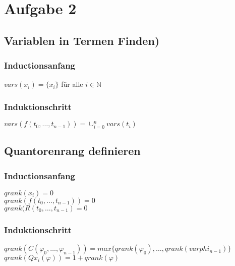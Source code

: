 \section*{Aufgabe 2}

\subsection*{Variablen in Termen Finden)}

\subsubsection*{Inductionsanfang}
$vars(x_i)=\{ x_i\} $ für alle $i \in \mathbb{N}$


\subsubsection*{Induktionschritt}
$vars(f(t_0, \ldots , t_{n-1}))= \cup_{i=0}^{n} vars(t_i)$

\subsection*{Quantorenrang definieren}
\subsubsection*{Inductionsanfang}
$qrank(x_i)=0$\\
$qrank(f(t_0, \ldots ,t_{n-1} ))=0$\\
$qrank(R(t_0, \ldots , t_{n-1})=0$\\
\subsubsection*{Induktionschritt}
$qrank(C(\varphi_{0}, \ldots , \varphi_{n-1}))= max\{ qrank(\varphi_{0}) , \ldots , qrank(varphi_{n-1}) \}$\\
$qrank(Qx_i (\varphi))= 1+ qrank(\varphi)$

